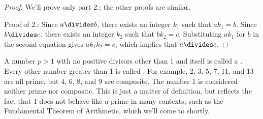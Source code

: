 \begin{proof}
We'll prove only part 2.; the other proofs are similar.

Proof of 2.:  Since $a \divides b$, there exists an integer $k_1$ such
that $a k_1 = b$.  Since $b \divides c$, there exists an integer $k_2$
such that $b k_2 = c$.  Substituting $a k_1$ for $b$ in the second
equation gives $a k_1 k_2 = c$, which implies that $a \divides c$.

\end{proof}

A number $p > 1$ with no positive divisors other than 1 and itself is
called a .  Every other number greater than 1 is called
.  For example, 2, 3, 5, 7, 11, and 13 are all prime,
but 4, 6, 8, and 9 are composite.  The number 1 is considered neither
prime nor composite.  This is just a matter of definition, but
reflects the fact that 1 does not behave like a prime in many
contexts, such as the Fundamental Theorem of Arithmetic, which we'll
come to shortly.

